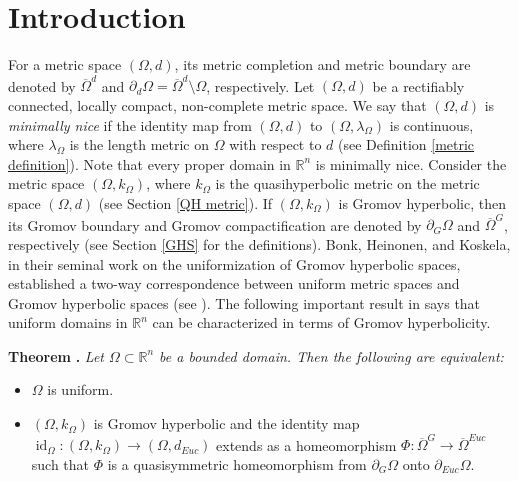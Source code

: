 \documentclass[a4paper,12pt]{amsart}
\theoremstyle{definition}
\newcounter{alphabet}
\newenvironment{Thm}[1][]{\refstepcounter{alphabet}%
	\bigskip%
	\noindent%
	{\bf Theorem \Alph{alphabet}}%
	\ifthenelse{\equal{#1}{}}{}{ (#1)}%
	{\bf .} \itshape}{\vskip 8pt}
\begin{document}
\section{Introduction}
For a metric space $(\Omega,d)$, its metric completion and metric boundary are denoted by $\overline{\Omega}^d$ and $\partial_d\Omega=\overline{\Omega}^d\setminus \Omega$, respectively. Let $(\Omega,d)$ be a rectifiably connected, locally compact, non-complete metric space. We say that $(\Omega,d)$ is \emph{minimally nice} if the identity map from $(\Omega,d)$ to $(\Omega,\lambda_{\Omega})$ is continuous, where $\lambda_{\Omega}$ is the length metric on $\Omega$ with respect to $d$ (see Definition \ref{metric definition}). Note that every proper domain in $\mathbb{R}^n$ is minimally nice. Consider the metric space $(\Omega,k_{\Omega})$, where $k_{\Omega}$ is the quasihyperbolic metric on the metric space $(\Omega,d)$ (see Section \ref{QH metric}). If  $(\Omega, k_{\Omega})$ is Gromov hyperbolic, then its  Gromov boundary and Gromov compactification are denoted by $\partial_{G}\Omega$ and  $\overline{\Omega}^G$, respectively (see Section \ref{GHS} for the definitions).
Bonk, Heinonen, and Koskela, in their seminal work \cite{BHK} on the uniformization of Gromov hyperbolic spaces, established a two-way correspondence between uniform metric spaces and Gromov hyperbolic spaces (see \cite[Theorem 1.1]{BHK}). The following important result in \cite{BHK} says that uniform domains in $\mathbb{R}^n$ can be characterized in terms of Gromov hyperbolicity.

\begin{Thm}\cite[Theorem 1.11]{BHK}
	Let $\Omega\subset \mathbb{R}^n$ be a bounded domain. Then the following are equivalent:
	\begin{itemize}
		\item[(i)] $\Omega$ is uniform.
		\item[(ii)] $(\Omega,k_{\Omega})$ is Gromov hyperbolic and the identity map $\operatorname{id}_\Omega:(\Omega,k_{\Omega})\to(\Omega,d_{Euc})$ extends as a homeomorphism $\Phi:\overline{\Omega}^G\to \overline{\Omega}^{Euc}$ such that $\Phi$ is a quasisymmetric homeomorphism from $\partial_{G}\Omega$ onto $\partial_{Euc}\Omega$.
	\end{itemize}
\end{Thm}
\end{document}

